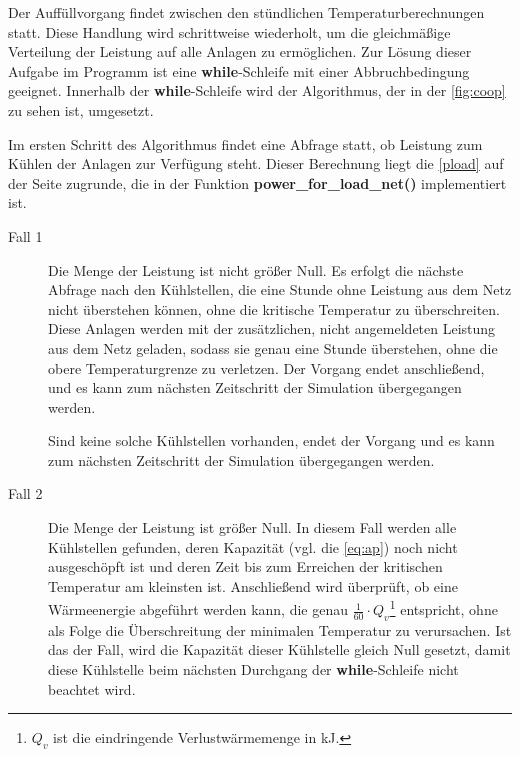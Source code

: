 Der Auff\"ullvorgang findet zwischen den st\"undlichen Temperaturberechnungen
statt. Diese Handlung wird schrittweise wiederholt, um die gleichm\"a\ss ige
Verteilung der Leistung auf alle Anlagen zu erm\"oglichen. Zur L\"osung dieser
Aufgabe im Programm ist eine \textbf{while}-Schleife mit einer Abbruchbedingung
geeignet. Innerhalb der \textbf{while}-Schleife wird der Algorithmus, der in
der \cref{fig:coop} zu sehen ist, umgesetzt.

Im ersten Schritt des Algorithmus findet eine Abfrage statt, ob Leistung zum
K\"uhlen der Anlagen zur Verf\"ugung steht. Dieser Berechnung liegt die
\cref{pload} auf der Seite \pageref{pload} zugrunde, die in der Funktion
\textbf{power\_for\_load\_net()} implementiert ist.

\begin{description}
\item[Fall 1] Die Menge der Leistung ist nicht gr\"o\ss er Null. Es erfolgt die
n\"achste Abfrage nach den K\"uhlstellen, die eine Stunde ohne Leistung aus dem
Netz nicht \"uberstehen k\"onnen, ohne die kritische Temperatur zu
\"uberschreiten.  Diese Anlagen werden mit der zus\"atzlichen, nicht
angemeldeten Leistung aus dem Netz geladen, sodass sie genau eine Stunde
\"uberstehen, ohne die obere Temperaturgrenze zu verletzen. Der Vorgang endet
anschlie\ss end, und es kann zum n\"achsten Zeitschritt der Simulation
\"ubergegangen werden.

Sind keine solche K\"uhlstellen vorhanden, endet der Vorgang und es kann zum
n\"achsten Zeitschritt der Simulation \"ubergegangen werden.

\item[Fall 2] Die Menge der Leistung ist gr\"o\ss er Null. In diesem Fall werden
alle K\"uhlstellen gefunden, deren Kapazit\"at (vgl. die \cref{eq:ap}) noch
nicht ausgesch\"opft ist und deren Zeit bis zum Erreichen der kritischen
Temperatur am kleinsten ist.  Anschlie\ss end wird \"uberpr\"uft, ob eine
W\"armeenergie abgef\"uhrt werden kann, die genau $\frac{1}{60}\cdot
Q_v$\footnote{ $Q_v$ ist die eindringende Verlustw\"armemenge in kJ.}
entspricht, ohne als Folge die \"Uberschreitung der minimalen Temperatur zu
verursachen. Ist das der Fall, wird die Kapazit\"at dieser K\"uhlstelle gleich
Null gesetzt, damit diese K\"uhlstelle beim n\"achsten Durchgang der
\textbf{while}-Schleife nicht beachtet wird.


\end{description}
